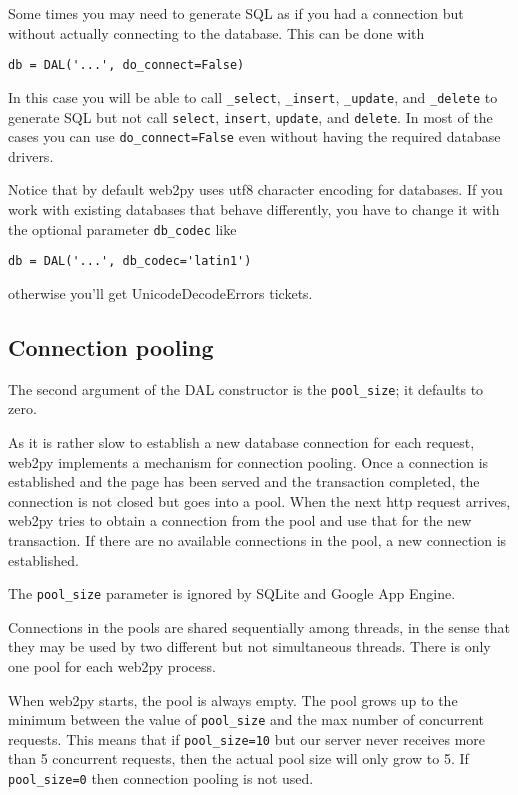 \documentclass[justified,sixbynine,notoc]{tufte-book}
\def\ft{\small\tt}
\def\inxx#1{\index{#1}}
\begin{document}
\begin{fullwidth}
Some times you may need to generate SQL as if you had a connection but without actually connecting to the database. This can be done with

\begin{lstlisting}
db = DAL('...', do_connect=False)
\end{lstlisting}

In this case you will be able to call {\ft \_select}, {\ft \_insert}, {\ft \_update}, and {\ft \_delete} to generate SQL but not call {\ft select}, {\ft insert}, {\ft update}, and {\ft delete}. In most of the cases you can use {\ft do\_connect=False} even without having the required database drivers.

Notice that by default web2py uses utf8 character encoding for databases. If you work with existing databases that behave differently, you have to change it with the optional parameter {\ft db\_codec} like

\begin{lstlisting}
db = DAL('...', db_codec='latin1')
\end{lstlisting}
\noindent otherwise you'll get UnicodeDecodeErrors tickets.

\goodbreak\subsection{Connection pooling}

\inxx{connection pooling}

The second argument of the DAL constructor is the {\ft pool\_size}; it defaults to zero.

As it is rather slow to establish a new database connection for each request, web2py implements a mechanism for connection pooling. Once a connection is established and the page has been served and the transaction completed, the connection is not closed but goes into a pool. When the next http request arrives, web2py tries to obtain a connection from the pool and use that for the new transaction. If there are no available connections in the pool, a new connection is established.

The {\ft pool\_size} parameter is ignored by SQLite and Google App Engine.

Connections in the pools are shared sequentially among threads, in the sense that they may be used by two different but not simultaneous threads. There is only one pool for each web2py process.

When web2py starts, the pool is always empty. The pool grows up to the minimum between the value of {\ft pool\_size} and the max number of concurrent requests. This means that if {\ft pool\_size=10} but our server never receives more than 5 concurrent requests, then the actual pool size will only grow to 5. If {\ft pool\_size=0} then connection pooling is not used.


\end{fullwidth}
\end{document}
